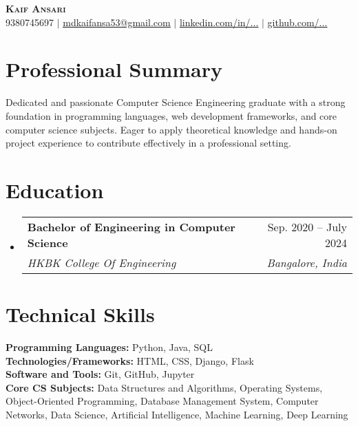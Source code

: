 \documentclass[letterpaper,11pt]{article}
\makeatletter
\newcommand{\resumeSubheading}[4]{
  \vspace{-2pt}\item
    \begin{tabular*}{0.97\textwidth}[t]{l@{\extracolsep{\fill}}r}
      \textbf{#1} & #2 \\
      \textit{\small#3} & \textit{\small #4} \\
    \end{tabular*}\vspace{-7pt}
}
\newcommand{\resumeSubHeadingListStart}{\begin{itemize}[leftmargin=0.15in, label={}]}
\newcommand{\resumeSubHeadingListEnd}{\end{itemize}}
\makeatother
\begin{document}
\begin{center}
    \textbf{\Huge \scshape Kaif Ansari} \\ \vspace{1pt}
    \small 9380745697 $|$ \href{mailto:mdkaifansa53@gmail.com}{\underline{mdkaifansa53@gmail.com}} $|$ 
    \href{https://linkedin.com/in/...}{\underline{linkedin.com/in/...}} $|$
    \href{https://github.com/...}{\underline{github.com/...}}
\end{center}

\section{Professional Summary}
\small{Dedicated and passionate Computer Science Engineering graduate with a strong foundation in programming languages, web development frameworks, and core computer science subjects. Eager to apply theoretical knowledge and hands-on project experience to contribute effectively in a professional setting.}

\section{Education}
\resumeSubHeadingListStart
  \resumeSubheading
    {Bachelor of Engineering in Computer Science}{Sep. 2020 -- July 2024}
    {HKBK College Of Engineering}{Bangalore, India}
\resumeSubHeadingListEnd

\section{Technical Skills}
\begin{itemize}[leftmargin=0.15in, label={}]
  \small{\item{
   \textbf{Programming Languages:} Python, Java, SQL \\
   \textbf{Technologies/Frameworks:} HTML, CSS, Django, Flask \\
   \textbf{Software and Tools:} Git, GitHub, Jupyter \\
   \textbf{Core CS Subjects:} Data Structures and Algorithms, Operating Systems, Object-Oriented Programming, Database Management System, Computer Networks, Data Science, Artificial Intelligence, Machine Learning, Deep Learning
  }}
\end{itemize}
\end{document}
